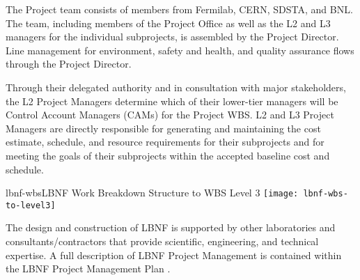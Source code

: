 The Project team consists of members from Fermilab, CERN, SDSTA, and BNL.  The team, including members of the Project Office as well as the L2 and L3 managers for the individual subprojects, is assembled by the Project Director. 
Line management for environment, safety and health, and quality assurance flows through the Project Director. 


Through their delegated authority and in consultation with major stakeholders, the L2 Project Managers determine which of their lower-tier managers will be Control Account Managers (CAMs) for the Project WBS. L2 and L3 Project Managers are directly responsible for generating and maintaining the cost estimate, schedule, and resource requirements for their subprojects and for meeting the goals of their subprojects within the accepted baseline cost and schedule. 

\begin{cdrfigure}{lbnf-wbs}{LBNF Work Breakdown Structure to WBS Level 3}
  \texttt{[image: lbnf-wbs-to-level3]}
\end{cdrfigure}

The design and construction of LBNF is supported by other laboratories and consultants/contractors that provide scientific, engineering, and technical expertise. A full description of LBNF Project Management is contained within the LBNF Project Management Plan \fixme{[ref]}.



